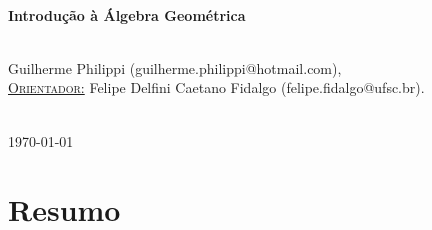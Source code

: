 \documentclass[11pt]{article}
\begin{document}
\begin{titlepage}


\HRule \\[0.4cm]
{ \LARGE \bfseries Introdução à Álgebra Geométrica} \\ [0.4cm] %
\HRule \\[2.5cm]
 

\begin{minipage}{1\textwidth}
	\begin{center} \large
		Guilherme Philippi (guilherme.philippi@hotmail.com),
		\vspace{0.5cm}
		\\
		\underline{\textsc{Orientador:}} \vspace{0.2cm}
		Felipe Delfini Caetano Fidalgo (felipe.fidalgo@ufsc.br).
	\end{center}
\end{minipage} \\[2cm]


{\large \today} %


\vfill %

\end{titlepage}

\tableofcontents


\section{Resumo}
\end{document}
